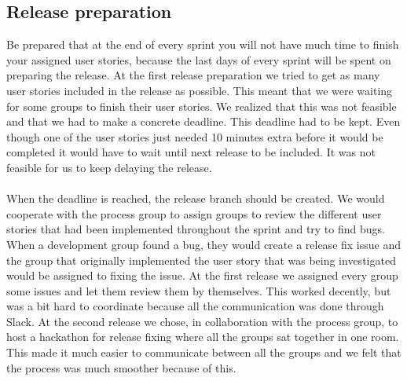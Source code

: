 \subsection{Release preparation}
Be prepared that at the end of every sprint you will not have much time to finish your assigned user stories, because the last days of every sprint will be spent on preparing the release.
At the first release preparation we tried to get as many user stories included in the release as possible.
This meant that we were waiting for some groups to finish their user stories.
We realized that this was not feasible and that we had to make a concrete deadline.
This deadline had to be kept.
Even though one of the user stories just needed 10 minutes extra before it would be completed it would have to wait until next release to be included.
It was not feasible for us to keep delaying the release.
\\\\
When the deadline is reached, the release branch should be created.
We would cooperate with the process group to assign groups to review the different user stories that had been implemented throughout the sprint and try to find bugs.
When a development group found a bug, they would create a release fix issue and the group that originally implemented the user story that was being investigated would be assigned to fixing the issue.
At the first release we assigned every group some issues and let them review them by themselves.
This worked decently, but was a bit hard to coordinate because all the communication was done through Slack.
At the second release we chose, in collaboration with the process group, to host a hackathon for release fixing where all the groups sat together in one room.
This made it much easier to communicate between all the groups and we felt that the process was much smoother because of this.

